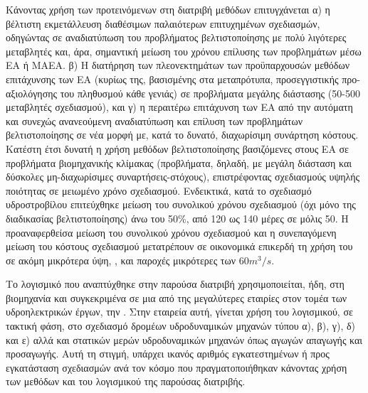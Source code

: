 Κάνοντας χρήση των προτεινόμενων στη διατριβή μεθόδων επιτυγχάνεται α) η βέλτιστη εκμετάλλευση διαθέσιμων παλαιότερων επιτυχημένων σχεδιασμών, οδηγώντας σε αναδιατύπωση του προβλήματος βελτιστοποίησης με πολύ λιγότερες μεταβλητές και, άρα, σημαντική μείωση του χρόνου επίλυσης των προβλημάτων μέσω ΕΑ ή ΜΑΕΑ. β) Η διατήρηση των πλεονεκτημάτων των προϋπαρχουσών μεθόδων επιτάχυνσης των ΕΑ (κυρίως της, βασισμένης στα μεταπρότυπα, προσεγγιστικής προ-αξιολόγησης του πληθυσμού κάθε γενιάς) σε προβλήματα μεγάλης διάστασης (50-500 μεταβλητές σχεδιασμού), και γ) η περαιτέρω επιτάχυνση των ΕΑ από την αυτόματη και συνεχώς ανανεούμενη αναδιατύπωση και επίλυση των προβλημάτων βελτιστοποίησης σε νέα μορφή με, κατά το δυνατό, διαχωρίσιμη συνάρτηση κόστους. Κατέστη έτσι δυνατή η χρήση μεθόδων βελτιστοποίησης βασιζόμενες στους ΕΑ σε προβλήματα βιομηχανικής κλίμακας (προβλήματα, δηλαδή, με μεγάλη διάσταση και  δύσκολες μη-διαχωρίσιμες συναρτήσεις-στόχους), επιστρέφοντας σχεδιασμούς υψηλής ποιότητας σε μειωμένο χρόνο σχεδιασμού. Ενδεικτικά, κατά το σχεδιασμό υδροστροβίλου  επιτεύχθηκε μείωση του συνολικού χρόνου σχεδιασμού (όχι μόνο της διαδικασίας βελτιστοποίησης) άνω του 50\%, από 120 ως 140 μέρες σε μόλις 50.  Η προαναφερθείσα μείωση του συνολικού χρόνου σχεδιασμού και η συνεπαγόμενη μείωση του κόστους σχεδιασμού μετατρέπουν σε οικονομικά επικερδή τη χρήση του σε ακόμη μικρότερα ύψη, , και παροχές μικρότερες των $60m^3/s$.

Το λογισμικό που αναπτύχθηκε στην παρούσα διατριβή χρησιμοποιείται, ήδη, στη βιομηχανία και συγκεκριμένα σε μια από της μεγαλύτερες εταιρίες στον τομέα των υδροηλεκτρικών έργων, την . Στην εταιρεία αυτή, γίνεται χρήση του λογισμικού, σε τακτική φάση, στο σχεδιασμό δρομέων υδροδυναμικών μηχανών τύπου α), β), γ),  δ) και ε) αλλά και στατικών μερών υδροδυναμικών μηχανών όπως αγωγών απαγωγής και προσαγωγής. Αυτή τη στιγμή, υπάρχει ικανός αριθμός εγκατεστημένων ή προς εγκατάσταση σχεδιασμών ανά τον κόσμο που πραγματοποιήθηκαν κάνοντας χρήση των μεθόδων και του λογισμικού της παρούσας διατριβής.  

